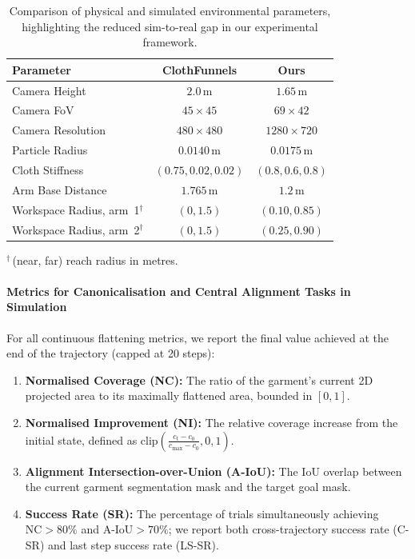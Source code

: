 \documentclass[journal]{IEEEtran}
\begin{document}
\begin{table}[!t]
\caption{Comparison of physical and simulated environmental parameters, highlighting the reduced sim-to-real gap in our experimental framework.}
\label{tab:sim-real-params}
\centering
\footnotesize
\setlength{\tabcolsep}{4pt}
\begin{tabular}{l|cc}
\toprule
\textbf{Parameter} & \textbf{ClothFunnels} & \textbf{Ours} \\
\midrule
Camera Height & $2.0\,\mathrm{m}$ & $1.65\,\mathrm{m}$ \\
Camera FoV  & $45{\times}45$ & $69{\times}42$ \\
Camera Resolution  & $480{\times}480$ & $1280{\times}720$ \\
Particle Radius & $0.0140\,\mathrm{m}$ & $0.0175\,\mathrm{m}$ \\
Cloth Stiffness & $(0.75, 0.02, 0.02)$ & $(0.8, 0.6, 0.8)$ \\
Arm Base Distance & $1.765\,\mathrm{m}$ & $1.2\,\mathrm{m}$ \\
Workspace Radius, arm~1$^{\dagger}$ & $(0, 1.5)$ & $(0.10, 0.85)$ \\
Workspace Radius, arm~2$^{\dagger}$ & $(0, 1.5)$ & $(0.25, 0.90)$ \\
\bottomrule
\end{tabular}

{\footnotesize $^{\dagger}$\,(near, far) reach radius in metres.}
\end{table}

\paragraph{Metrics for Canonicalisation and Central Alignment Tasks in Simulation}
For all continuous flattening metrics, we report the final value achieved at the end of the trajectory (capped at 20 steps):
\begin{enumerate}
    \item \textbf{Normalised Coverage (NC):} The ratio of the garment's current 2D projected area to its maximally flattened area, bounded in $[0, 1]$.
    \item \textbf{Normalised Improvement (NI):} The relative coverage increase from the initial state, defined as $\text{clip}(\frac{c_t - c_0}{c_{\text{max}} - c_0}, 0, 1)$.
    \item \textbf{Alignment Intersection-over-Union (A-IoU):} The IoU overlap between the current garment segmentation mask and the target goal mask.
    \item \textbf{Success Rate (SR):} The percentage of trials simultaneously achieving $\text{NC} > 80\%$ and $\text{A-IoU} > 70\%$; we report both cross-trajectory success rate (C-SR) and last step success rate (LS-SR).
\end{enumerate}
\end{document}
